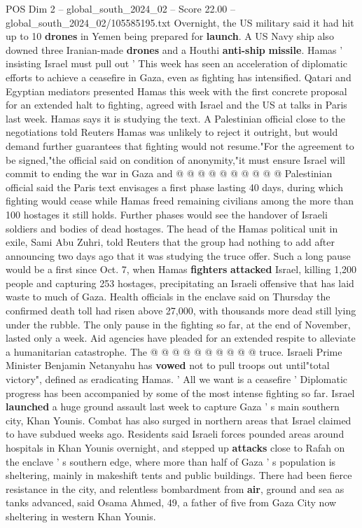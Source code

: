 \begin{textsample}{POS Dim 2 – global\_south\_2024\_02 – Score 22.00 – global\_south\_2024\_02/105585195.txt}
Overnight, the US military said it had hit up to 10 \textbf{drones} in Yemen being prepared for \textbf{launch}.
A US Navy ship also downed three Iranian-made \textbf{drones} and a Houthi \textbf{anti-ship} \textbf{missile}.
Hamas ' insisting Israel must pull out ' This week has seen an acceleration of diplomatic efforts to achieve a ceasefire in Gaza, even as fighting has intensified.
Qatari and Egyptian mediators presented Hamas this week with the first concrete proposal for an extended halt to fighting, agreed with Israel and the US at talks in Paris last week.
Hamas says it is studying the text.
A Palestinian official close to the negotiations told Reuters Hamas was unlikely to reject it outright, but would demand further guarantees that fighting would not resume."For the agreement to be signed,"the official said on condition of anonymity,"it must ensure Israel will commit to ending the war in Gaza and @ @ @ @ @ @ @ @ @ @ Palestinian official said the Paris text envisages a first phase lasting 40 days, during which fighting would cease while Hamas freed remaining civilians among the more than 100 hostages it still holds.
Further phases would see the handover of Israeli soldiers and bodies of dead hostages.
The head of the Hamas political unit in exile, Sami Abu Zuhri, told Reuters that the group had nothing to add after announcing two days ago that it was studying the truce offer.
Such a long pause would be a first since Oct. 7, when Hamas \textbf{fighters} \textbf{attacked} Israel, killing 1,200 people and capturing 253 hostages, precipitating an Israeli offensive that has laid waste to much of Gaza.
Health officials in the enclave said on Thursday the confirmed death toll had risen above 27,000, with thousands more dead still lying under the rubble.
The only pause in the fighting so far, at the end of November, lasted only a week.
Aid agencies have pleaded for an extended respite to alleviate a humanitarian catastrophe.
The @ @ @ @ @ @ @ @ @ @ truce.
Israeli Prime Minister Benjamin Netanyahu has \textbf{vowed} not to pull troops out until"total victory", defined as eradicating Hamas. ' All we want is a ceasefire ' Diplomatic progress has been accompanied by some of the most intense fighting so far.
Israel \textbf{launched} a huge ground assault last week to capture Gaza ' s main southern city, Khan Younis.
Combat has also surged in northern areas that Israel claimed to have subdued weeks ago.
Residents said Israeli forces pounded areas around hospitals in Khan Younis overnight, and stepped up \textbf{attacks} close to Rafah on the enclave ' s southern edge, where more than half of Gaza ' s population is sheltering, mainly in makeshift tents and public buildings.
There had been fierce resistance in the city, and relentless bombardment from \textbf{air}, ground and sea as tanks advanced, said Osama Ahmed, 49, a father of five from Gaza City now sheltering in western Khan Younis.

\end{textsample}
